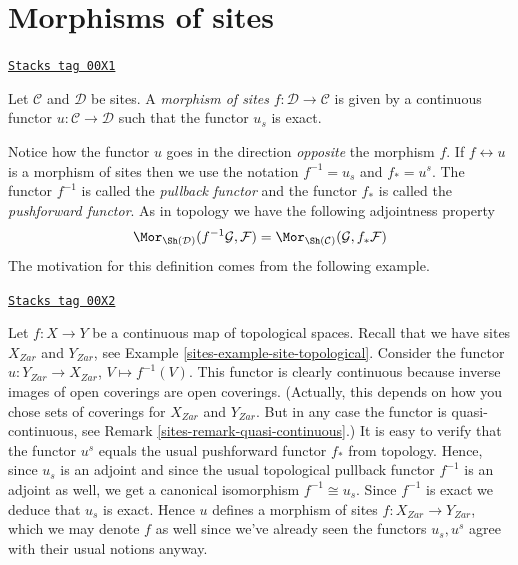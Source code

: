 \section{Morphisms of sites}
\label{sites-section-morphism-sites}
\begin{definition}
\label{sites-definition-morphism-sites}
\href{https://stacks.math.columbia.edu/tag/00X1}{\texttt{Stacks tag 00X1}}

Let $\mathcal{C}$ and $\mathcal{D}$ be sites.
A {\it morphism of sites} $f : \mathcal{D} \to \mathcal{C}$
is given by a continuous functor $u : \mathcal{C} \to \mathcal{D}$
such that the functor $u_s$ is exact.
\end{definition}

Notice how the functor $u$ goes in the direction {\it opposite}
the morphism $f$. If $f \leftrightarrow u$ is a morphism of sites
then we use the notation $f^{-1} = u_s$ and $f_* = u^s$.
The functor $f^{-1}$ is called the {\it pullback functor} and
the functor $f_*$ is called the {\it pushforward functor}.
As in topology we have the following adjointness property
$$
\Mor_{\Sh(\mathcal{D})}(f^{-1}\mathcal{G}, \mathcal{F})
=
\Mor_{\Sh(\mathcal{C})}(\mathcal{G}, f_*\mathcal{F})
$$
The motivation for this definition comes from the following
example.

\begin{example}
\label{sites-example-continuous-map}
\href{https://stacks.math.columbia.edu/tag/00X2}{\texttt{Stacks tag 00X2}}

Let $f : X  \to Y$ be a continuous map of topological spaces.
Recall that we have sites $X_{Zar}$ and $Y_{Zar}$,
see Example \ref{sites-example-site-topological}. Consider the functor
$u : Y_{Zar} \to X_{Zar}$, $V \mapsto f^{-1}(V)$.
This functor is clearly continuous because inverse images of
open coverings are open coverings. (Actually, this depends on how
you chose sets of coverings for $X_{Zar}$ and $Y_{Zar}$.
But in any case the functor is quasi-continuous, see Remark
\ref{sites-remark-quasi-continuous}.)
It is easy to verify that
the functor $u^s$ equals the usual pushforward functor $f_*$
from topology. Hence, since $u_s$ is an adjoint and since
the usual topological pullback functor $f^{-1}$ is an adjoint as well,
we get a canonical isomorphism $f^{-1} \cong u_s$. Since $f^{-1}$
is exact we deduce that $u_s$ is exact. Hence $u$ defines a morphism
of sites $f : X_{Zar} \to Y_{Zar}$, which we may denote
$f$ as well since we've already seen the functors $u_s, u^s$ agree
with their usual notions anyway.
\end{example}


